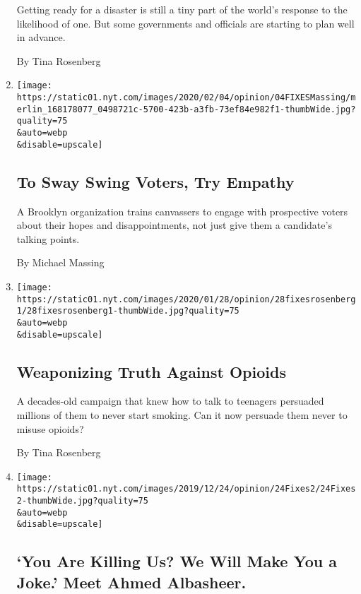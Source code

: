 \begin{enumerate}
  Getting ready for a disaster is still a tiny part of the world's
  response to the likelihood of one. But some governments and officials
  are starting to plan well in advance.

  By Tina Rosenberg
\item
  \href{/2020/02/04/opinion/election-2020.html}{}

  \texttt{[image: https://static01.nyt.com/images/2020/02/04/opinion/04FIXESMassing/merlin\_168178077\_0498721c-5700-423b-a3fb-73ef84e982f1-thumbWide.jpg?quality=75\\\&auto=webp\\\&disable=upscale]}

  \hypertarget{to-sway-swing-voters-try-empathy}{%
  \subsection{To Sway Swing Voters, Try
  Empathy}\label{to-sway-swing-voters-try-empathy}}

  A Brooklyn organization trains canvassers to engage with prospective
  voters about their hopes and disappointments, not just give them a
  candidate's talking points.

  By Michael Massing
\item
  \href{/2020/01/28/opinion/opioid-drug-prevention-ads.html}{}

  \texttt{[image: https://static01.nyt.com/images/2020/01/28/opinion/28fixesrosenberg1/28fixesrosenberg1-thumbWide.jpg?quality=75\\\&auto=webp\\\&disable=upscale]}

  \hypertarget{weaponizing-truth-against-opioids}{%
  \subsection{Weaponizing Truth Against
  Opioids}\label{weaponizing-truth-against-opioids}}

  A decades-old campaign that knew how to talk to teenagers persuaded
  millions of them to never start smoking. Can it now persuade them
  never to misuse opioids?

  By Tina Rosenberg
\item
  \href{/2019/12/26/opinion/albasheer-show-iraq-political-revolution.html}{}

  \texttt{[image: https://static01.nyt.com/images/2019/12/24/opinion/24Fixes2/24Fixes2-thumbWide.jpg?quality=75\\\&auto=webp\\\&disable=upscale]}

  \hypertarget{you-are-killing-us-we-will-make-you-a-joke-meet-ahmed-albasheer}{%
  \subsection{`You Are Killing Us? We Will Make You a Joke.' Meet Ahmed
  Albasheer.}\label{you-are-killing-us-we-will-make-you-a-joke-meet-ahmed-albasheer}}


\end{enumerate}

